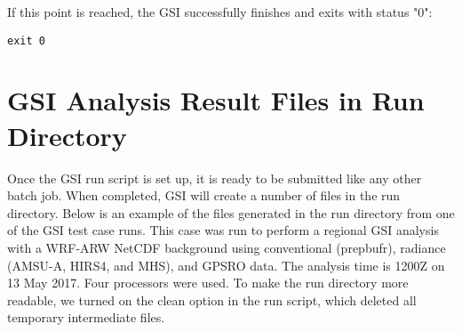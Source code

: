 If this point is reached, the GSI successfully finishes and exits with status "0":

\begin{small}
\begin{verbatim}
exit 0
\end{verbatim}
\end{small}

\section{GSI Analysis Result Files in Run Directory}\label{sec3.3}

Once the GSI run script is set up, it is ready to be submitted like any other batch job. When completed, GSI will create a number of files in the run directory. Below is an example of the files generated in the run directory from one of the GSI test case runs. This case was run to perform a regional GSI analysis with a WRF-ARW NetCDF background using conventional (prepbufr), radiance (AMSU-A, HIRS4, and MHS), and GPSRO data. The analysis time is 1200Z on 13 May 2017. Four processors were used. To make the run directory more readable, we turned on the clean option in the run script, which deleted all temporary intermediate files. 

